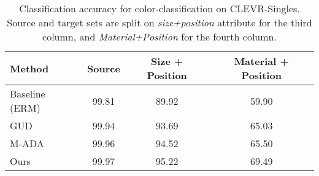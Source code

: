 \begin{table}
    \centering
    \begin{tabular}{@{}lccc@{}}
        \toprule
        \textbf{Method} & \textbf{Source} & \textbf{Size + Position} & \textbf{Material + Position} \\ 
        \midrule
        Baseline (ERM)           & 99.81 & 89.92 & 59.90 \\
        GUD~\citep{volpi2018generalizing}         & 99.94 & 93.69 & 65.03 \\
        M-ADA~\citep{qiao2020learning}      & 99.96 & 94.52 & 65.50 \\
        Ours        & 99.97 & 95.22 & 69.49 \\ 
        \bottomrule
    \end{tabular}
    \caption{Classification accuracy for color-classification on CLEVR-Singles. 
    Source and target sets are split on \textit{size+position} attribute for the third column, and \textit{Material+Position} for the fourth column.}
    \label{tab:clevr_results}
\end{table}